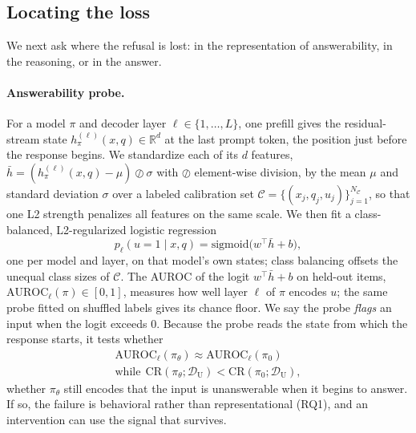\subsection{Locating the loss}
\label{sec:method-diagnose}

We next ask where the refusal is lost: in the representation of answerability, in the
reasoning, or in the answer.

\paragraph{Answerability probe.}
For a model $\pi$ and decoder layer $\ell \in \{1,\dots,L\}$, one prefill gives the
residual-stream state $h^{(\ell)}_{\pi}(x,q) \in \mathbb{R}^{d}$ at the last prompt token,
the position just before the response begins. We standardize each of its $d$ features,
$\bar{h} = (h^{(\ell)}_{\pi}(x,q) - \mu) \oslash \sigma$ with $\oslash$ element-wise
division, by the mean $\mu$ and standard deviation $\sigma$ over a labeled calibration set
$\mathcal{C} = \{(x_j, q_j, u_j)\}_{j=1}^{N_{\mathcal{C}}}$, so that one L2 strength
penalizes all features on the same scale. We then fit a class-balanced, L2-regularized
logistic regression
\begin{equation}
p_\ell(u = 1 \mid x, q) = \mathrm{sigmoid}\big(w^\top \bar{h} + b\big),
\label{eq:probe}
\end{equation}
one per model and layer, on that model's own states; class balancing offsets the unequal
class sizes of $\mathcal{C}$. The AUROC of the logit $w^\top \bar{h} + b$ on held-out
items, $\mathrm{AUROC}_\ell(\pi) \in [0,1]$, measures how well layer $\ell$ of $\pi$ encodes
$u$; the same probe fitted on shuffled labels gives its chance floor. We say the probe
\emph{flags} an input when the logit exceeds $0$. Because the probe reads the state from
which the response starts, it tests whether
\begin{equation}
\begin{gathered}
\mathrm{AUROC}_\ell(\pi_\theta) \approx \mathrm{AUROC}_\ell(\pi_0) \\
\text{while}\ \
\mathrm{CR}(\pi_\theta;\mathcal{D}_{\mathrm{U}}) < \mathrm{CR}(\pi_0;\mathcal{D}_{\mathrm{U}}),
\end{gathered}
\label{eq:diagnose}
\end{equation}
\ie whether $\pi_\theta$ still encodes that the input is unanswerable when it begins to
answer. If so, the failure is behavioral rather than representational (RQ1), and an
intervention can use the signal that survives.

